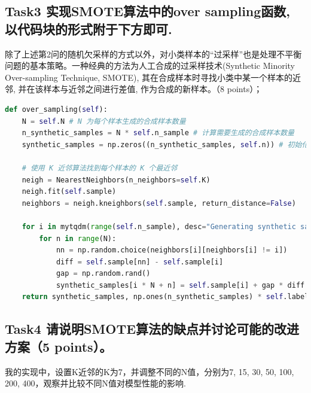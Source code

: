 \documentclass[8pt]{article}
\begin{document}
\subsection*{Task3 实现SMOTE算法中的over sampling函数, 以代码块的形式附于下方即可.}
除了上述第2问的随机欠采样的方式以外，对小类样本的“过采样”也是处理不平衡问题的基本策略。一种经典的方法为人工合成的过采样技术(Synthetic Minority Over-sampling Technique, SMOTE), 其在合成样本时寻找小类中某一个样本的近邻, 并在该样本与近邻之间进行差值, 作为合成的新样本。（8 points）；
\begin{lstlisting}[breaklines=true, language=Python, caption=过采样函数实现]
def over_sampling(self):
    N = self.N # N 为每个样本生成的合成样本数量
    n_synthetic_samples = N * self.n_sample # 计算需要生成的合成样本数量
    synthetic_samples = np.zeros((n_synthetic_samples, self.n)) # 初始化合成样本数组

    # 使用 K 近邻算法找到每个样本的 K 个最近邻
    neigh = NearestNeighbors(n_neighbors=self.K)
    neigh.fit(self.sample)
    neighbors = neigh.kneighbors(self.sample, return_distance=False)

    for i in mytqdm(range(self.n_sample), desc="Generating synthetic samples"):
        for n in range(N):
            nn = np.random.choice(neighbors[i][neighbors[i] != i])
            diff = self.sample[nn] - self.sample[i]
            gap = np.random.rand()
            synthetic_samples[i * N + n] = self.sample[i] + gap * diff
    return synthetic_samples, np.ones(n_synthetic_samples) * self.label
\end{lstlisting}

\subsection*{Task4 请说明SMOTE算法的缺点并讨论可能的改进方案（5 points）。}
我的实现中，设置K近邻的K为7，并调整不同的N值，分别为7, 15, 30, 50, 100, 200, 400，观察并比较不同N值对模型性能的影响.
\end{document}
